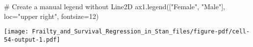 \documentclass[
  letterpaper,
  DIV=11,
  numbers=noendperiod]{scrartcl}
\newenvironment{Shaded}{\begin{snugshade}}{\end{snugshade}}
\newcommand{\CommentTok}[1]{\textcolor[rgb]{0.37,0.37,0.37}{#1}}
\newcommand{\DecValTok}[1]{\textcolor[rgb]{0.68,0.00,0.00}{#1}}
\newcommand{\NormalTok}[1]{\textcolor[rgb]{0.00,0.23,0.31}{#1}}
\newcommand{\OperatorTok}[1]{\textcolor[rgb]{0.37,0.37,0.37}{#1}}
\newcommand{\StringTok}[1]{\textcolor[rgb]{0.13,0.47,0.30}{#1}}
\begin{document}
\begin{Shaded}
\begin{Highlighting}[]
\CommentTok{\# Create a manual legend without Line2D}
\NormalTok{ax1.legend([}\StringTok{"Female"}\NormalTok{, }\StringTok{"Male"}\NormalTok{], loc}\OperatorTok{=}\StringTok{"upper right"}\NormalTok{, fontsize}\OperatorTok{=}\DecValTok{12}\NormalTok{)}
\end{Highlighting}
\end{Shaded}

\texttt{[image: Frailty\_and\_Survival\_Regression\_in\_Stan\_files/figure-pdf/cell-54-output-1.pdf]}
\end{document}
